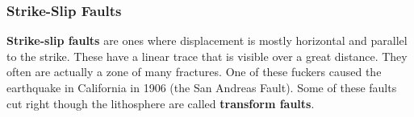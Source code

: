 \documentclass{article}
\begin{document}
\subsubsection{Strike-Slip Faults} %
\label{sub:strike_slip_faults}
\textbf{Strike-slip faults} are ones where displacement is mostly horizontal and parallel to the strike. These have a linear trace that is visible over a great distance. They often are actually a zone of many fractures. One of these fuckers caused the earthquake in California in 1906 (the San Andreas Fault). Some of these faults cut right though the lithosphere are called \textbf{transform faults}.
\end{document}
